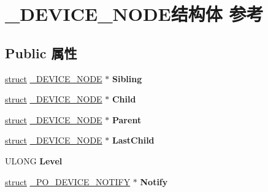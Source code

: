 \hypertarget{struct___d_e_v_i_c_e___n_o_d_e}{}\section{\+\_\+\+D\+E\+V\+I\+C\+E\+\_\+\+N\+O\+D\+E结构体 参考}
\label{struct___d_e_v_i_c_e___n_o_d_e}
\subsection*{Public 属性}
\begin{DoxyCompactItemize}
\item 
\mbox{\label{struct___d_e_v_i_c_e___n_o_d_e_a1e546a4ee184009a4a0f57a65e755833}} 
\hyperlink{interfacestruct}{struct} \hyperlink{struct___d_e_v_i_c_e___n_o_d_e}{\+\_\+\+D\+E\+V\+I\+C\+E\+\_\+\+N\+O\+DE} $\ast$ {\bfseries Sibling}
\item 
\mbox{\label{struct___d_e_v_i_c_e___n_o_d_e_a29bc8717a52869679e9066b002ee2852}} 
\hyperlink{interfacestruct}{struct} \hyperlink{struct___d_e_v_i_c_e___n_o_d_e}{\+\_\+\+D\+E\+V\+I\+C\+E\+\_\+\+N\+O\+DE} $\ast$ {\bfseries Child}
\item 
\mbox{\label{struct___d_e_v_i_c_e___n_o_d_e_a41ff01817268833c1b648b1c06960d47}} 
\hyperlink{interfacestruct}{struct} \hyperlink{struct___d_e_v_i_c_e___n_o_d_e}{\+\_\+\+D\+E\+V\+I\+C\+E\+\_\+\+N\+O\+DE} $\ast$ {\bfseries Parent}
\item 
\mbox{\label{struct___d_e_v_i_c_e___n_o_d_e_a2ef2073682479d804e9540e030225b6e}} 
\hyperlink{interfacestruct}{struct} \hyperlink{struct___d_e_v_i_c_e___n_o_d_e}{\+\_\+\+D\+E\+V\+I\+C\+E\+\_\+\+N\+O\+DE} $\ast$ {\bfseries Last\+Child}
\item 
\mbox{\label{struct___d_e_v_i_c_e___n_o_d_e_a74b73db40cb1bf38460d1bdc439b2e57}} 
U\+L\+O\+NG {\bfseries Level}
\item 
\mbox{\label{struct___d_e_v_i_c_e___n_o_d_e_a41bafdc44c96a7dc0938135b79c7aaf7}} 
\hyperlink{interfacestruct}{struct} \hyperlink{struct___p_o___d_e_v_i_c_e___n_o_t_i_f_y}{\+\_\+\+P\+O\+\_\+\+D\+E\+V\+I\+C\+E\+\_\+\+N\+O\+T\+I\+FY} $\ast$ {\bfseries Notify}

\end{DoxyCompactItemize}
